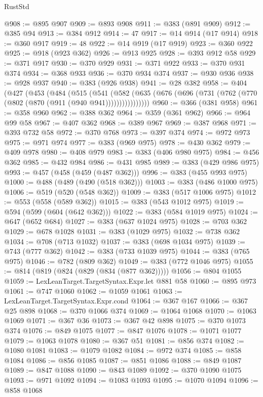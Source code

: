 \begin{lexlean}{RustStd}
\begin{coremodule}
@908 := @895 @907
@909 := @893 @908
@911 := @383 (@891 @909)
@912 := @385 @94
@913 := @384 @912
@914 := 47
@917 := @14 @914 (@17 @914)
@918 := @360 @917
@919 := 48
@922 := @14 @919 (@17 @919)
@923 := @360 @922
@925 := @918 (@923 @362)
@926 := @913 @925
@928 := @393 @912 @58
@929 := @371 @917
@930 := @370 @929
@931 := @371 @922
@933 := @370 @931 @374
@934 := @368 @933
@936 := @370 @934 @374
@937 := @930 @936
@938 := @928 @937
@940 := @383 (@926 @938)
@941 := @28 @382
@958 := @404
    (@427
      (@453
        (@484
          (@515
            (@541
              (@582 (@635 (@676 (@696 (@731 (@762 (@770 (@802 (@870 (@911 (@940 @941))))))))))))))))
@960 := @366 (@381 @958)
@961 := @358 @960
@962 := @388 @362
@964 := @359 (@361 @962)
@966 := @964 @99 @58
@967 := @407 @362
@968 := @389 @967
@969 := @387 @968
@971 := @393 @732 @58
@972 := @370 @768
@973 := @397 @374
@974 := @972 @973
@975 := @971 @974
@977 := @383 (@969 @975)
@978 := @430 @362
@979 := @409 @978
@980 := @408 @979
@983 := @383 (@406 @980 @975)
@984 := @456 @362
@985 := @432 @984
@986 := @431 @985
@989 := @383 (@429 @986 @975)
@993 := @457 (@458 (@459 (@487 @362)))
@996 := @383 (@455 @993 @975)
@1000 := @488 (@489 (@490 (@518 @362)))
@1003 := @383 (@486 @1000 @975)
@1006 := @519 (@520 (@548 @362))
@1009 := @383 (@517 @1006 @975)
@1012 := @553 (@558 (@589 @362))
@1015 := @383 (@543 @1012 @975)
@1019 := @594 (@599 (@604 (@642 @362)))
@1022 := @383 (@584 @1019 @975)
@1024 := @647 (@652 @684)
@1027 := @383 (@637 @1024 @975)
@1028 := @703 @362
@1029 := @678 @1028
@1031 := @383 (@1029 @975)
@1032 := @738 @362
@1034 := @708 (@713 @1032)
@1037 := @383 (@698 @1034 @975)
@1039 := @743 (@777 @362)
@1042 := @383 (@733 @1039 @975)
@1044 := @383 (@765 @975)
@1046 := @782 (@809 @362)
@1049 := @383 (@772 @1046 @975)
@1055 := @814 (@819 (@824 (@829 (@834 (@877 @362)))))
@1056 := @804 @1055
@1059 := LexLeanTarget.TargetSyntax.Expr.let @881 @58
@1060 := @895 @973
@1061 := @747 @1060
@1062 := @1059 @1061
@1063 := LexLeanTarget.TargetSyntax.Expr.cond
@1064 := @367 @167
@1066 := @367 @25 @898
@1068 := @370 @1066 @374
@1069 := @1064 @1068
@1070 := @1063 @1069
@1071 := @367 @36
@1073 := @367 @42 @898
@1075 := @370 @1073 @374
@1076 := @849 @1075
@1077 := @847 @1076
@1078 := @1071 @1077
@1079 := @1063 @1078
@1080 := @367 @51
@1081 := @856 @374
@1082 := @1080 @1081
@1083 := @1079 @1082
@1084 := @972 @374
@1085 := @858 @1084
@1086 := @856 @1085
@1087 := @851 @1086
@1088 := @849 @1087
@1089 := @847 @1088
@1090 := @843 @1089
@1092 := @370 @1090 @1075
@1093 := @971 @1092
@1094 := @1083 @1093
@1095 := @1070 @1094
@1096 := @858 @1068

\end{coremodule}
\end{lexlean}
